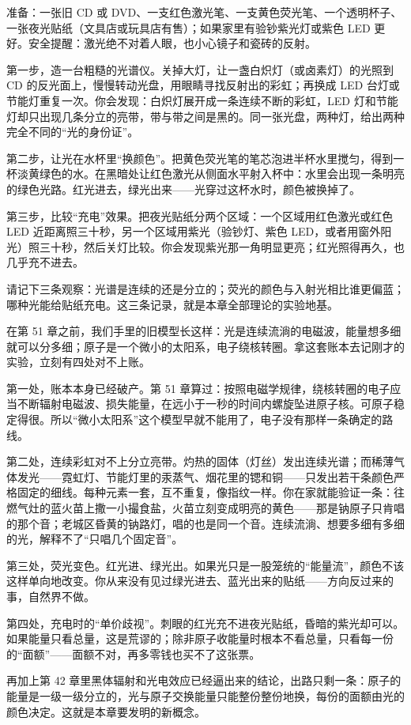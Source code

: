 
\begin{experiment}[光盘分光与荧光水]
准备：一张旧 CD 或 DVD、一支红色激光笔、一支黄色荧光笔、一个透明杯子、一张夜光贴纸（文具店或玩具店有售）；如果家里有验钞紫光灯或紫色 LED 更好。安全提醒：激光绝不对着人眼，也小心镜子和瓷砖的反射。

第一步，造一台粗糙的光谱仪。关掉大灯，让一盏白炽灯（或卤素灯）的光照到 CD 的反光面上，慢慢转动光盘，用眼睛寻找反射出的彩虹；再换成 LED 台灯或节能灯重复一次。你会发现：白炽灯展开成一条连续不断的彩虹，LED 灯和节能灯却只出现几条分立的亮带，带与带之间是黑的。同一张光盘，两种灯，给出两种完全不同的“光的身份证”。

第二步，让光在水杯里“换颜色”。把黄色荧光笔的笔芯泡进半杯水里搅匀，得到一杯淡黄绿色的水。在黑暗处让红色激光从侧面水平射入杯中：水里会出现一条明亮的绿色光路。红光进去，绿光出来——光穿过这杯水时，颜色被换掉了。

第三步，比较“充电”效果。把夜光贴纸分两个区域：一个区域用红色激光或红色 LED 近距离照三十秒，另一个区域用紫光（验钞灯、紫色 LED，或者用窗外阳光）照三十秒，然后关灯比较。你会发现紫光那一角明显更亮；红光照得再久，也几乎充不进去。

请记下三条观察：光谱是连续的还是分立的；荧光的颜色与入射光相比谁更偏蓝；哪种光能给贴纸充电。这三条记录，就是本章全部理论的实验地基。
\end{experiment}


\begin{mainline}
在第 51 章之前，我们手里的旧模型长这样：光是连续流淌的电磁波，能量想多细就可以分多细；原子是一个微小的太阳系，电子绕核转圈。拿这套账本去记刚才的实验，立刻有四处对不上账。

第一处，账本本身已经破产。第 51 章算过：按照电磁学规律，绕核转圈的电子应当不断辐射电磁波、损失能量，在远小于一秒的时间内螺旋坠进原子核。可原子稳定得很。所以“微小太阳系”这个模型早就不能用了，电子没有那样一条确定的路线。

第二处，连续彩虹对不上分立亮带。灼热的固体（灯丝）发出连续光谱；而稀薄气体发光——霓虹灯、节能灯里的汞蒸气、烟花里的锶和铜——只发出若干条颜色严格固定的细线。每种元素一套，互不重复，像指纹一样。你在家就能验证一条：往燃气灶的蓝火苗上撒一小撮食盐，火苗立刻变成明亮的黄色——那是钠原子只肯唱的那个音；老城区昏黄的钠路灯，唱的也是同一个音。连续流淌、想要多细有多细的光，解释不了“只唱几个固定音”。

第三处，荧光变色。红光进、绿光出。如果光只是一股笼统的“能量流”，颜色不该这样单向地改变。你从来没有见过绿光进去、蓝光出来的贴纸——方向反过来的事，自然界不做。

第四处，充电时的“单价歧视”。刺眼的红光充不进夜光贴纸，昏暗的紫光却可以。如果能量只看总量，这是荒谬的；除非原子收能量时根本不看总量，只看每一份的“面额”——面额不对，再多零钱也买不了这张票。

再加上第 42 章里黑体辐射和光电效应已经逼出来的结论，出路只剩一条：原子的能量是一级一级分立的，光与原子交换能量只能整份整份地换，每份的面额由光的颜色决定。这就是本章要发明的新概念。
\end{mainline}

